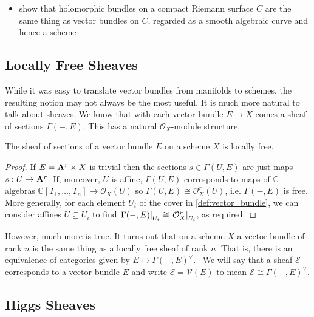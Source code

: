 \documentclass[12pt]{ociamthesis}  %
\begin{document}
\begin{itemize}
  \item show that holomorphic bundles on a compact Riemann surface $C$
    are the same thing as vector bundles on $C$, regarded as a smooth algebraic curve and hence a scheme
\end{itemize}

\missingsection

\subsection{Locally Free Sheaves}\label{sec:locally_free_sheaves}

While it was easy to translate vector bundles from manifolds
to schemes, the resulting notion may not always be the most
useful. It is much more natural to talk about sheaves. We know
that with each vector bundle $E\to X$ comes a sheaf of sections
$\Gamma(-,E)$. This has a natural $\mathcal O_X$-module structure.

\begin{lemma}
  The sheaf of sections of a vector bundle $E$ on a scheme $X$ is
  locally free.
  \begin{proof}
    If $E=\mathbf{A}^{r}_{}\times X$ is
    trivial then the sections $s\in\Gamma(U,E)$ are just maps
    $s:U\to \mathbf{A}^{r}_{}$. If, moreover, $U$ is affine,
    $\Gamma(U,E)$ corresponds to maps of
    $\mathbb{C}$-algebras
    $\mathbb{C}[T_1,\ldots,T_n]\to\mathcal O_X(U)$ so
    $\Gamma(U,E)\cong \mathcal O^r_X(U)$, i.e. $\Gamma(-,E)$
    is free.
    More generally, for each element $U_i$ of the cover in
    \ref{def:vector_bundle}, we can consider affines $U\subseteq U_i$
    to find $\left.{\Gamma(-,E)}\right\vert_{U_i}\cong \left.{\mathcal O_X^r}\right\vert_{U_i}$,
    as required.
  \end{proof}
\end{lemma}

However, much more is true. It turns out that on a scheme $X$
a vector bundle of rank $n$ is the same thing as a locally
free sheaf of rank $n$. That is, there is an equivalence
of categories given by $E \mapsto \Gamma(-,E)^\vee$.~\cite[128-129]{hartshorne1977}
We will say that a sheaf $\mathcal E$ corresponds to a vector bundle
$E$ and write $\mathcal E=\mathscr V(E)$ to mean
$\mathcal E\cong\Gamma(-,E)^\vee$.

\subsection{Higgs Sheaves}
\end{document}
